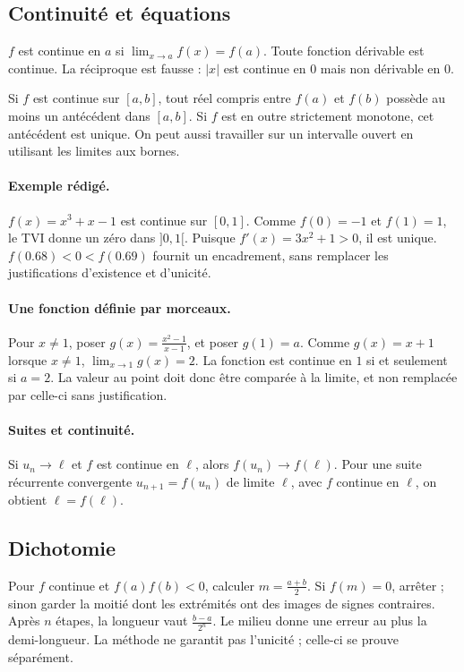 \subsection{Continuité et équations}
$f$ est continue en $a$ si $\lim_{x\to a}f(x)=f(a)$. Toute fonction dérivable est continue. La réciproque est fausse : $|x|$ est continue en $0$ mais non dérivable en $0$.
\begin{keypoint}
Si $f$ est continue sur $[a,b]$, tout réel compris entre $f(a)$ et $f(b)$ possède au moins un antécédent dans $[a,b]$. Si $f$ est en outre strictement monotone, cet antécédent est unique. On peut aussi travailler sur un intervalle ouvert en utilisant les limites aux bornes.
\end{keypoint}
\paragraph{Exemple rédigé.} $f(x)=x^3+x-1$ est continue sur $[0,1]$. Comme $f(0)=-1$ et $f(1)=1$, le TVI donne un zéro dans $]0,1[$. Puisque $f'(x)=3x^2+1>0$, il est unique. $f(\num{0,68})<0<f(\num{0,69})$ fournit un encadrement, sans remplacer les justifications d'existence et d'unicité.
\paragraph{Une fonction définie par morceaux.} Pour $x\ne1$, poser $g(x)=\frac{x^2-1}{x-1}$, et poser $g(1)=a$. Comme $g(x)=x+1$ lorsque $x\ne1$, $\lim_{x\to1}g(x)=2$. La fonction est continue en $1$ si et seulement si $a=2$. La valeur au point doit donc être comparée à la limite, et non remplacée par celle-ci sans justification.
\paragraph{Suites et continuité.} Si $u_n\to\ell$ et $f$ est continue en $\ell$, alors $f(u_n)\to f(\ell)$. Pour une suite récurrente convergente $u_{n+1}=f(u_n)$ de limite $\ell$, avec $f$ continue en $\ell$, on obtient $\ell=f(\ell)$.
\subsection{Dichotomie}
Pour $f$ continue et $f(a)f(b)<0$, calculer $m=\frac{a+b}{2}$. Si $f(m)=0$, arrêter ; sinon garder la moitié dont les extrémités ont des images de signes contraires. Après $n$ étapes, la longueur vaut $\frac{b-a}{2^n}$. Le milieu donne une erreur au plus la demi-longueur. La méthode ne garantit pas l'unicité ; celle-ci se prouve séparément.


